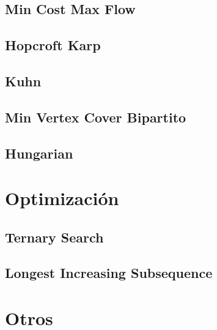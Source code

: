 \documentclass[a4paper,11pt,landscape,twocolumn]{article}
\begin{document}


\subsection{Min Cost Max Flow}



\subsection{Hopcroft Karp}



\subsection{Kuhn}



\subsection{Min Vertex Cover Bipartito}



\subsection{Hungarian}



\section{Optimización}

\subsection{Ternary Search}



\subsection{Longest Increasing Subsequence}



\section{Otros}
\end{document}
